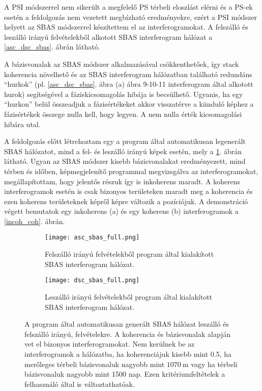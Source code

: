 \documentclass[12pt]{report}
\numberwithin{equation}{section}
\numberwithin{table}{section}
\numberwithin{figure}{section}
\begin{document}
A PSI módszerrel nem sikerült a megfelelő PS térbeli eloszlást elérni és a PS-ek esetén a feldolgozás nem vezetett megbízható eredményekre, ezért a PSI módszer helyett az SBAS módszerrel készítettem el az interferogramokat. A felszálló és leszálló irányú felvételekből alkotott SBAS interferogram hálózat a \ref{asc_dsc_sbas}. ábrán látható.

A bázisvonalak az SBAS módszer alkalmazásával csökkenthetőek, így stack koherencia növelhető és az SBAS interferogram hálózatban található redundáns ``hurkok'' (pl. \ref{asc_dsc_sbas}. ábra (a) ábra 9-10-11 interferogram által alkotott hurok) segítségével a fáziskicsomagolás hibája is becsülhető. Ugyanis, ha egy ``hurkon'' belül összeadjuk a fázisértékeket akkor visszatérve a kiinduló képhez a fázisértékek összege nulla kell, hogy legyen. A nem nulla érték kicsomagolási hibára utal.

A \stamps feldolgozás előtt létrehoztam egy  a program által automatikusan legenerált SBAS hálózatot, mind a fel- és leszálló irányú képek esetén, mely a \ref{asc_dsc_sbas_full}. ábrán látható. Ugyan az SBAS módszer kisebb bázisvonalakat eredményezett, mind térben és időben, képmegjelenítő programmal megvizsgálva az interferogramokat, megállapítottam, hogy jelentős részuk így is inkoherens maradt. A koherens interferogramok esetén is csak bizonyos területeken maradt meg a koherencia és ezen koherens területeknek képről képre változik a pozíciójuk. A demonstráció végett bemutatok egy inkoherens (a) és egy koherens (b) interferogramok a \ref{incoh_coh}. ábrán.

\begin{center}
    \begin{figure}[H]
        \begin{subfigure}[t]{.49\linewidth}
            \centering
            \texttt{[image: asc\_sbas\_full.png]}
            \caption{Felszálló irányú felvételekből \stamps program által kialakított SBAS interferogram hálózat.}
        \end{subfigure}
        \hspace{10pt}
        \begin{subfigure}[t]{.49\linewidth}
            \centering
            \texttt{[image: dsc\_sbas\_full.png]}
            \caption{Leszálló irányú felvételekből \stamps program által kialakított SBAS interferogram hálózat.}
        \end{subfigure}
    \caption{A \stamps program által automatikusan generált SBAS hálózat leszálló és felszálló irányú, felvételekre. A \stamps koherencia és bázisvonalak alapján vet el bizonyos interferogramokat. Nem kerülnek be az interferogramok a hálózatba, ha koherenciájuk kisebb mint 0.5, ha merőleges térbeli bázisvonaluk nagyobb mint $\SI{1070}{\meter}$ vagy ha térbeli bázisvonaluk nagyobb mint 1500 nap. Ezen kritériumfeltételek a felhasználó által is változtathatóak.}\label{asc_dsc_sbas_full}
    \end{figure}
\end{center}
\end{document}
